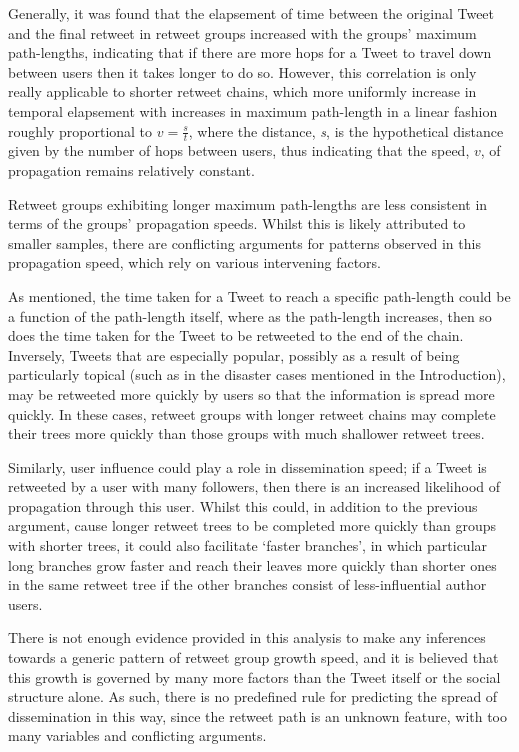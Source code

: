 Generally, it was found that the elapsement of time between the original Tweet and the final retweet in retweet groups increased with the groups' maximum path-lengths, indicating that if there are more hops for a Tweet to travel down between users then it takes longer to do so. However, this correlation is only really applicable to shorter retweet chains, which more uniformly increase in temporal elapsement with increases in maximum path-length in a linear fashion roughly proportional to $ v=\frac{s}{t} $, where the distance, \textit{s}, is the hypothetical distance given by the number of hops between users, thus indicating that the speed, $v$, of propagation remains relatively constant. 

Retweet groups exhibiting longer maximum path-lengths are less consistent in terms of the groups' propagation speeds. Whilst this is likely attributed to smaller samples, there are conflicting arguments for patterns observed in this propagation speed, which rely on various intervening factors. 

As mentioned, the time taken for a Tweet to reach a specific path-length could be a function of the path-length itself, where as the path-length increases, then so does the time taken for the Tweet to be retweeted to the end of the chain. Inversely, Tweets that are especially popular, possibly as a result of being particularly topical (such as in the disaster cases mentioned in the Introduction), may be retweeted more quickly by users so that the information is spread more quickly. In these cases, retweet groups with longer retweet chains may complete their trees more quickly than those groups with much shallower retweet trees.

Similarly, user influence could play a role in dissemination speed; if a Tweet is retweeted by a user with many followers, then there is an increased likelihood of propagation through this user. Whilst this could, in addition to the previous argument, cause longer retweet trees to be completed more quickly than groups with shorter trees, it could also facilitate `faster branches', in which particular long branches grow faster and reach their leaves more quickly than shorter ones in the same retweet tree if the other branches consist of less-influential author users.

There is not enough evidence provided in this analysis to make any inferences towards a generic pattern of retweet group growth speed, and it is believed that this growth is governed by many more factors than the Tweet itself or the social structure alone. As such, there is no predefined rule for predicting the spread of dissemination in this way, since the retweet path is an unknown feature, with too many variables and conflicting arguments.

